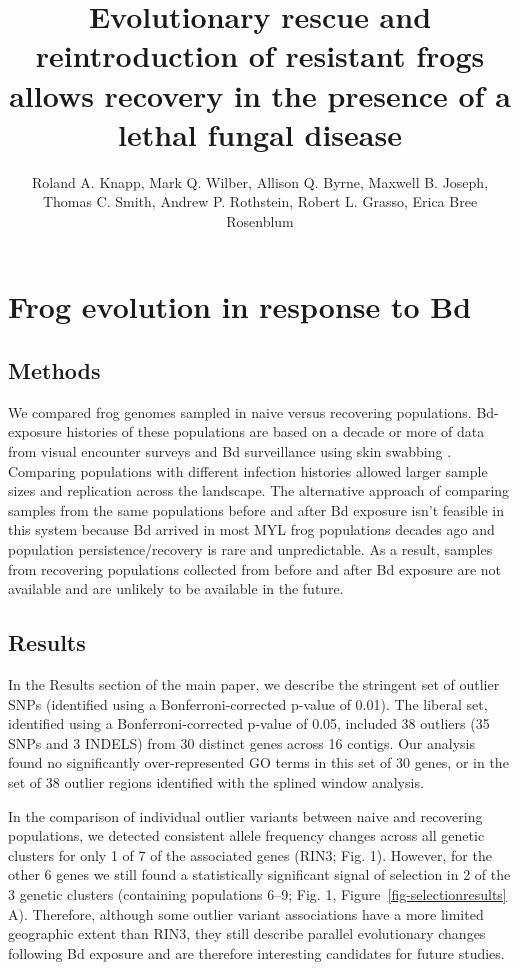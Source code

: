 \documentclass[9pt,twoside,lineno]{pnas-new}
\title{Evolutionary rescue and reintroduction of resistant frogs allows recovery in the presence of a lethal fungal disease}
\author{Roland A. Knapp, Mark Q. Wilber, Allison Q. Byrne, Maxwell B. Joseph, Thomas C. Smith, Andrew P. Rothstein, Robert L. Grasso, Erica Bree Rosenblum}
\begin{document}
\maketitle

\SItext
\hypertarget{frog-evolution-in-response-to-bd-2}{%
\section{Frog evolution in response to
Bd}\label{frog-evolution-in-response-to-bd-2}}

\hypertarget{methods}{%
\subsection{Methods}\label{methods}}

We compared frog genomes sampled in naive versus recovering populations.
Bd-exposure histories of these populations are based on a decade or more
of data from visual encounter surveys and Bd surveillance using skin
swabbing \citep[e.g.,][]{knapp2016}. Comparing populations with
different infection histories allowed larger sample sizes and
replication across the landscape. The alternative approach of comparing
samples from the same populations before and after Bd exposure isn't
feasible in this system because Bd arrived in most MYL frog populations
decades ago and population persistence/recovery is rare and
unpredictable. As a result, samples from recovering populations
collected from before and after Bd exposure are not available and are
unlikely to be available in the future.

\hypertarget{results-1}{%
\subsection{Results}\label{results-1}}

In the Results section of the main paper, we describe the stringent set
of outlier SNPs (identified using a Bonferroni-corrected p-value of
0.01). The liberal set, identified using a Bonferroni-corrected p-value
of 0.05, included 38 outliers (35 SNPs and 3 INDELS) from 30 distinct
genes across 16 contigs. Our analysis found no significantly
over-represented GO terms in this set of 30 genes, or in the set of 38
outlier regions identified with the splined window analysis.

In the comparison of individual outlier variants between naive and
recovering populations, we detected consistent allele frequency changes
across all genetic clusters for only 1 of 7 of the associated genes
(RIN3; Fig. 1). However, for the other 6
genes we still found a statistically significant signal of selection in
2 of the 3 genetic clusters (containing populations 6--9;
Fig. 1, Figure~\ref{fig-selectionresults}
A). Therefore, although some outlier variant associations have a more
limited geographic extent than RIN3, they still describe parallel
evolutionary changes following Bd exposure and are therefore interesting
candidates for future studies.
\end{document}
